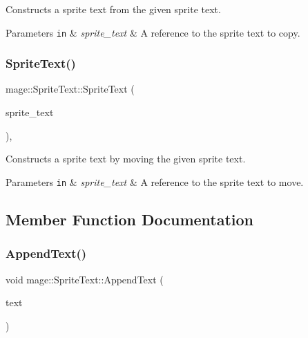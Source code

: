 Constructs a sprite text from the given sprite text.


\begin{DoxyParams}[1]{Parameters}
\mbox{\tt in}  & {\em sprite\+\_\+text} & A reference to the sprite text to copy. \\
\hline
\end{DoxyParams}
\hypertarget{classmage_1_1_sprite_text_ab569dfa4ff5a30f0a23005c43635aad7}{}\label{classmage_1_1_sprite_text_ab569dfa4ff5a30f0a23005c43635aad7} 
\subsubsection{\texorpdfstring{Sprite\+Text()}{SpriteText()}\hspace{0.1cm}{\footnotesize\ttfamily [3/3]}}
{\footnotesize\ttfamily mage\+::\+Sprite\+Text\+::\+Sprite\+Text (\begin{DoxyParamCaption}\item[{\hyperlink{classmage_1_1_sprite_text}{Sprite\+Text} \&\&}]{sprite\+\_\+text }\end{DoxyParamCaption})\hspace{0.3cm}{\ttfamily [protected]}, {\ttfamily [default]}}

Constructs a sprite text by moving the given sprite text.


\begin{DoxyParams}[1]{Parameters}
\mbox{\tt in}  & {\em sprite\+\_\+text} & A reference to the sprite text to move. \\
\hline
\end{DoxyParams}


\subsection{Member Function Documentation}
\hypertarget{classmage_1_1_sprite_text_acf993532a7b2e6ebb761b9b47cbdba98}{}\label{classmage_1_1_sprite_text_acf993532a7b2e6ebb761b9b47cbdba98} 
\subsubsection{\texorpdfstring{Append\+Text()}{AppendText()}\hspace{0.1cm}{\footnotesize\ttfamily [1/3]}}
{\footnotesize\ttfamily void mage\+::\+Sprite\+Text\+::\+Append\+Text (\begin{DoxyParamCaption}\item[{const wstring \&}]{text }\end{DoxyParamCaption})}

